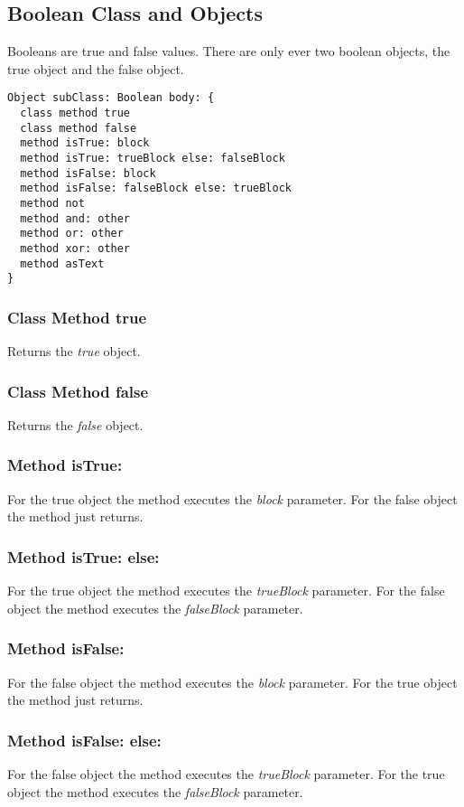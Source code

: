 \subsection {Boolean Class and Objects}

Booleans are true and false values. There are only ever two boolean objects,
the true object and the false object.

\begin{lstlisting}
Object subClass: Boolean body: {
  class method true
  class method false
  method isTrue: block
  method isTrue: trueBlock else: falseBlock
  method isFalse: block
  method isFalse: falseBlock else: trueBlock
  method not
  method and: other
  method or: other
  method xor: other
  method asText
}
\end{lstlisting}

\subsubsection{Class Method true}
Returns the \textit{true} object.

\subsubsection{Class Method false}
Returns the \textit{false} object.

\subsubsection{Method isTrue:}
For the true object the method executes the \textit{block} parameter. For
the false object the method just returns.

\subsubsection{Method isTrue: else:}
For the true object the method executes the \textit{trueBlock} parameter.
For the false object the method executes the \textit{falseBlock} parameter.

\subsubsection{Method isFalse:}
For the false object the method executes the \textit{block} parameter. For
the true object the method just returns.

\subsubsection{Method isFalse: else:}
For the false object the method executes the \textit{trueBlock} parameter.
For the true object the method executes the \textit{falseBlock} parameter.

